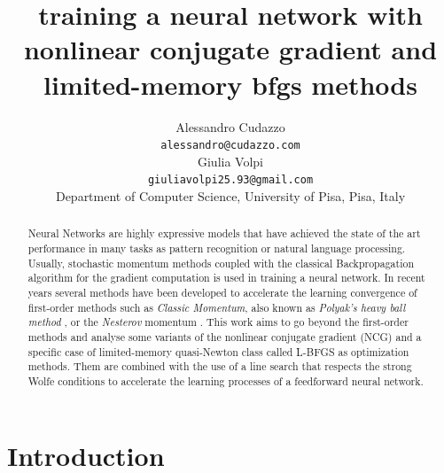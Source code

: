 \documentclass[11pt]{article}
\title{training a neural network with nonlinear conjugate gradient and limited-memory bfgs methods}
\author{
  Alessandro Cudazzo \\
  \texttt{alessandro@cudazzo.com} \\
   \And
  Giulia Volpi \\
  \texttt{giuliavolpi25.93@gmail.com} \\
  \AND
  Department of Computer Science, University of Pisa, Pisa, Italy
}
\begin{document}
\maketitle
\begin{abstract}
Neural Networks are highly expressive models that have achieved the state of the art performance in many tasks as pattern recognition or natural language processing. Usually, stochastic momentum methods coupled with the classical Backpropagation algorithm for the gradient computation is used in training a neural network.
In recent years several methods have been developed to accelerate the learning convergence of first-order methods such as \textit{Classic Momentum}, also known as \textit{Polyak's heavy ball method} \cite{Polyak1964}, or the \textit{Nesterov} momentum \cite{10029946121}.
This work aims to go beyond the first-order methods and analyse some variants of the nonlinear conjugate gradient (NCG) and a specific case of limited-memory quasi-Newton class called L-BFGS as optimization methods. Them are combined with  the use of a line search that respects the strong Wolfe conditions to accelerate the learning processes of a feedforward neural network.  
\end{abstract}

\section{Introduction}
\end{document}
